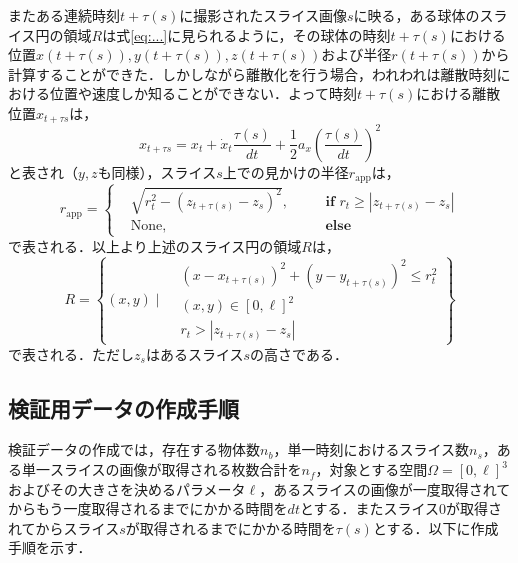    またある連続時刻$t + \tau(s)$に撮影されたスライス画像$s$に映る，ある球体のスライス円の領域$R$は式\ref{eq:...}に見られるように，その球体の時刻$t + \tau(s)$における位置$x(t + \tau(s)), y(t + \tau(s)), z(t + \tau(s))$および半径$r(t + \tau(s))$から計算することができた．しかしながら離散化を行う場合，われわれは離散時刻における位置や速度しか知ることができない．よって時刻$t + \tau(s)$における離散位置$x_{t + \tau{s}}$は，
    \begin{equation}
        \label{eq:discreated_position_on_slice}
        x_{t + \tau{s}} = x_t + \dot{x}_t \frac{\tau(s)}{dt} + \frac{1}{2} a_x \left(\frac{\tau(s)}{dt}\right)^2
    \end{equation}
    と表され（$y,z$も同様），スライス$s$上での見かけの半径$r_{\text{app}}$は，
    \begin{equation}
        \label{eq:discreated_appearant_radius}
        r_{\text{app}} = \left\{
            \begin{aligned}
               & \sqrt{r_t^2 - \left(z_{t + \tau(s)} - z_s\right)^2}, \quad&& \textbf{if }r_t \geq \left|z_{t + \tau(s)} - z_s\right|
               \\ & \text{None}, && \textbf{else}
            \end{aligned}
        \right.
    \end{equation}
    で表される．以上より上述のスライス円の領域$R$は，
    \begin{equation}
        \label{eq:discreated_slice_circle_region}
        R = \left\{(x, y) \mid 
        \begin{aligned}
            & (x - x_{t + \tau(s)})^2 + (y - y_{t + \tau(s)})^2 \leq r_t^2
            \\ & (x, y) \in [0, \ell]^2
            \\ & r_t > \left| z_{t + \tau(s)} - z_s \right|
        \end{aligned} 
        \right\}
    \end{equation}
    で表される．ただし$z_s$はあるスライス$s$の高さである．

    \subsection{検証用データの作成手順}

    検証データの作成では，存在する物体数$n_b$，単一時刻におけるスライス数$n_s$，ある単一スライスの画像が取得される枚数合計を$n_f$，対象とする空間$\Omega = [0, \ell]^3$およびその大きさを決めるパラメータ$\ell$，あるスライスの画像が一度取得されてからもう一度取得されるまでにかかる時間を$dt$とする．またスライス$0$が取得されてからスライス$s$が取得されるまでにかかる時間を$\tau(s)$とする．以下に作成手順を示す．

